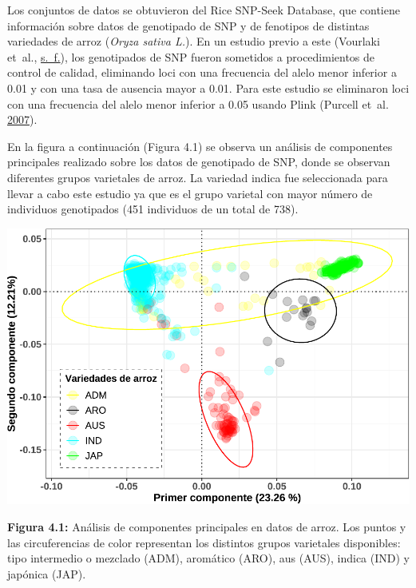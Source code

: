 \documentclass[11pt,spanish,a4paper,oneside,]{book} %
\begin{document}
Los conjuntos de datos se obtuvieron del Rice SNP-Seek Database, que contiene información sobre datos de genotipado de SNP y de fenotipos de distintas variedades de arroz (\emph{Oryza sativa L.}). En un estudio previo a este (Vourlaki et~al., \protect\hyperlink{ref-cite:26}{s.~f.}), los genotipados de SNP fueron sometidos a procedimientos de control de calidad, eliminando loci con una frecuencia del alelo menor inferior a 0.01 y con una tasa de ausencia mayor a 0.01. Para este estudio se eliminaron loci con una frecuencia del alelo menor inferior a 0.05 usando Plink (Purcell et~al. \protect\hyperlink{ref-cite:49}{2007}).

En la figura a continuación (Figura 4.1) se observa un análisis de componentes principales realizado sobre los datos de genotipado de SNP, donde se observan diferentes grupos varietales de arroz. La variedad indica fue seleccionada para llevar a cabo este estudio ya que es el grupo varietal con mayor número de individuos genotipados (451 individuos de un total de 738).

\begin{center}\includegraphics[width=1\linewidth]{figures/Graf_PCA} \end{center}

\begin{center}
\textbf{Figura 4.1:} Análisis de componentes principales en datos de arroz. Los puntos y las circuferencias de color representan los distintos grupos varietales disponibles: tipo intermedio o mezclado (ADM), aromático (ARO), aus (AUS), indica (IND) y japónica (JAP).

\end{center}
\end{document}

